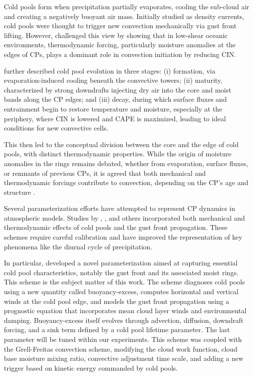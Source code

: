 Cold pools form when precipitation partially evaporates, cooling the sub-cloud air and creating a negatively buoyant air mass. Initially studied as density currents, cold pools were thought to trigger new convection mechanically via gust front lifting. However,  challenged this view by showing that in low-shear oceanic environments, thermodynamic forcing, particularly moisture anomalies at the edges of CPs, plays a dominant role in convection initiation by reducing CIN.

 further described cold pool evolution in three stages: (i) formation, via evaporation-induced cooling beneath the convective towers; (ii) maturity, characterized by strong downdrafts injecting dry air into the core and moist bands along the CP edges; and (iii) decay, during which surface fluxes and entrainment begin to restore temperature and moisture, especially at the periphery, where CIN is lowered and CAPE is maximized, leading to ideal conditions for new convective cells.

This then led to the conceptual division between the core and the edge of cold pools, with distinct thermodynamic properties. While the origin of moisture anomalies in the rings remains debated, whether from evaporation, surface fluxes, or remnants of previous CPs, it is agreed that both mechanical and thermodynamic forcings contribute to convection, depending on the CP's age and structure \cite{torri2015mechanisms, feng2015mechanisms}.

Several parameterization efforts have attempted to represent CP dynamics in atmospheric models. Studies by , , and others incorporated both mechanical and thermodynamic effects of cold pools and the gust front propagation. These schemes require careful calibration and have improved the representation of key phenomena like the diurnal cycle of precipitation.

In particular,  developed a novel parameterization aimed at capturing essential cold pool characteristics, notably the gust front and its associated moist rings. This scheme is the subject matter of this work. The scheme diagnoses cold pools using a new quantity called buoyancy-excess, computes horizontal and vertical winds at the cold pool edge, and models the gust front propagation using a prognostic equation that incorporates mean cloud layer winds and environmental damping. Buoyancy-excess itself evolves through advection, diffusion, downdraft forcing, and a sink term defined by a cold pool lifetime parameter. The last parameter will be tuned within our experiments. This scheme was coupled with the Grell-Freitas convection scheme, modifying the cloud work function, cloud base moisture mixing ratio, convective adjustment time scale, and adding a new trigger based on kinetic energy commanded by cold pools.

